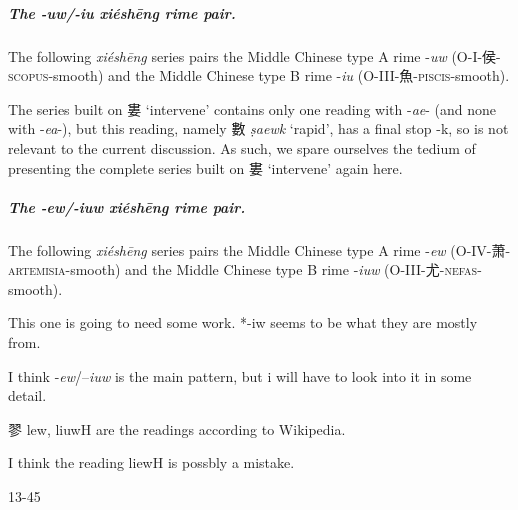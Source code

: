 \subparagraph{The -\textit{uw}/-\textit{iu} \textit{xiéshēng} rime pair.}
\label{subpar:uw-iu-XS-pair}
The following \textit{xiéshēng} series pairs the Middle Chinese type A rime -\textit{uw} (O-I-侯-\textsc{scopus}-smooth) and the Middle Chinese type B rime -\textit{iu} 
(O-III-魚-\textsc{piscis}-smooth). 





The series built on 婁 `intervene' contains only one reading with -\textit{ae}- (and none with -\textit{ea}-), but this reading, namely 
數 \textit{ṣaewk} `rapid', has a final stop -k, so is not relevant to the current discussion. As such, we spare ourselves the tedium of presenting the complete series built on 婁 `intervene' again here. 

\subparagraph{The -\textit{ew}/-\textit{iuw} \textit{xiéshēng} rime pair.}
\label{subpar:ew-iuw-XS-pair}
The following \textit{xiéshēng} series pairs the Middle Chinese type A rime -\textit{ew} (O-IV-萧-\textsc{artemisia}-smooth) and the Middle Chinese type B rime -\textit{iuw} (O-III-尤-\textsc{nefas}-smooth). 


This one is going to need some work. *-iw seems to be what they are mostly from. 

I think  -\textit{ew}/--\textit{iuw} is the main pattern, but i will have to look into it in some detail. 

翏 lew, liuwH are the readings according to Wikipedia. 

I think the reading liewH is possbly a mistake. 

13-45

